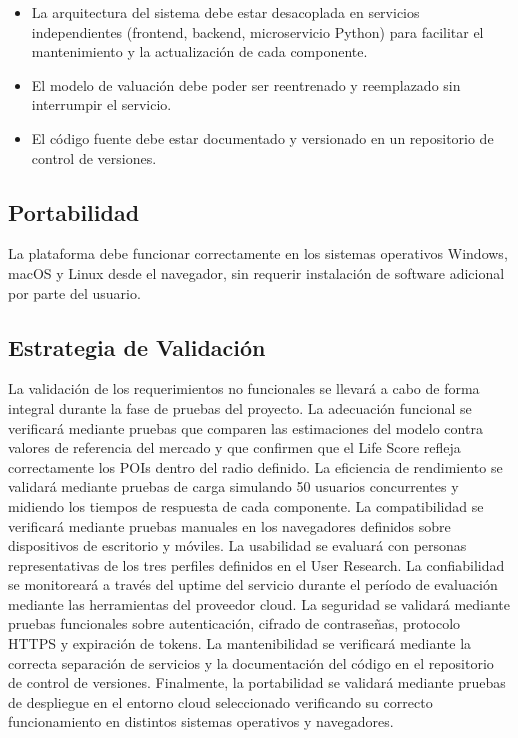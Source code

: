 \begin{itemize}
\item La arquitectura del sistema debe estar desacoplada en servicios independientes (frontend, backend, microservicio Python) para facilitar el mantenimiento y la actualización de cada componente.
\item El modelo de valuación debe poder ser reentrenado y reemplazado sin interrumpir el servicio.
\item El código fuente debe estar documentado y versionado en un repositorio de control de versiones.
\end{itemize}

\subsection{Portabilidad}

La plataforma debe funcionar correctamente en los sistemas operativos Windows, macOS y Linux desde el navegador, sin requerir instalación de software adicional por parte del usuario.

\subsection{Estrategia de Validación}

La validación de los requerimientos no funcionales se llevará a cabo de forma integral durante la fase de pruebas del proyecto. La adecuación funcional se verificará mediante pruebas que comparen las estimaciones del modelo contra valores de referencia del mercado y que confirmen que el Life Score refleja correctamente los POIs dentro del radio definido. La eficiencia de rendimiento se validará mediante pruebas de carga simulando 50 usuarios concurrentes y midiendo los tiempos de respuesta de cada componente. La compatibilidad se verificará mediante pruebas manuales en los navegadores definidos sobre dispositivos de escritorio y móviles. La usabilidad se evaluará con personas representativas de los tres perfiles definidos en el User Research. La confiabilidad se monitoreará a través del uptime del servicio durante el período de evaluación mediante las herramientas del proveedor cloud. La seguridad se validará mediante pruebas funcionales sobre autenticación, cifrado de contraseñas, protocolo HTTPS y expiración de tokens. La mantenibilidad se verificará mediante la correcta separación de servicios y la documentación del código en el repositorio de control de versiones. Finalmente, la portabilidad se validará mediante pruebas de despliegue en el entorno cloud seleccionado verificando su correcto funcionamiento en distintos sistemas operativos y navegadores.

